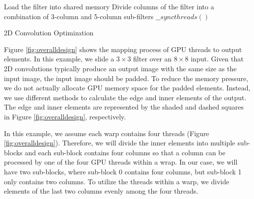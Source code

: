 \begin{algorithm}[t!]
\small
	Load the filter into shared memory\;
	Divide columns of the filter into a combination of 3-column and 5-column sub-filters\;
	$\_\_syncthreads()$\;
	\caption{2D Convolution Optimization}
	\label{algo:overalldesign}
\end{algorithm}

Figure \ref{fig:overalldesign} shows the mapping process of GPU threads to output elements. In this example, we slide a $3 \times 3$ filter
over an $8 \times 8$ input.  Given that 2D convolutions typically produce an output image with the same size as the input image, the
input image should be padded. To reduce the memory pressure, we do not actually allocate GPU memory space for the padded elements. Instead,
we use different methods to calculate the edge and inner elements of the output. The edge and inner elements are represented by the shaded
and dashed squares in Figure \ref{fig:overalldesign}, respectively.


In this example, we assume each warp contains four threads (Figure \ref{fig:overalldesign}). Therefore, we will divide the inner elements
into multiple sub-blocks and each sub-block contains four columns so that a column can be processed by one of the four GPU threads within a
wrap. In our case, we will have two sub-blocks, where sub-block 0 contains four columns, but sub-block 1 only contains two columns. To
utilize the threads within a warp, we divide elements of the last two columns evenly among the four threads.

